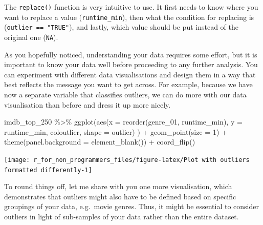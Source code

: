 \documentclass[
]{book}
\newenvironment{Shaded}{\begin{snugshade}}{\end{snugshade}}
\newcommand{\AttributeTok}[1]{\textcolor[rgb]{0.77,0.63,0.00}{#1}}
\newcommand{\DecValTok}[1]{\textcolor[rgb]{0.00,0.00,0.81}{#1}}
\newcommand{\FunctionTok}[1]{\textcolor[rgb]{0.00,0.00,0.00}{#1}}
\newcommand{\NormalTok}[1]{#1}
\newcommand{\SpecialCharTok}[1]{\textcolor[rgb]{0.00,0.00,0.00}{#1}}
\begin{document}
The \texttt{replace()} function is very intuitive to use. It first needs to know where you want to replace a value (\texttt{runtime\_min}), then what the condition for replacing is (\texttt{outlier\ ==\ "TRUE"}), and lastly, which value should be put instead of the original one (\texttt{NA}).

As you hopefully noticed, understanding your data requires some effort, but it is important to know your data well before proceeding to any further analysis. You can experiment with different data visualisations and design them in a way that best reflects the message you want to get across. For example, because we have now a separate variable that classifies outliers, we can do more with our data visualisation than before and dress it up more nicely.

\begin{Shaded}
\begin{Highlighting}[]
\NormalTok{imdb\_top\_250 }\SpecialCharTok{\%\textgreater{}\%}
  \FunctionTok{ggplot}\NormalTok{(}\FunctionTok{aes}\NormalTok{(}\AttributeTok{x =} \FunctionTok{reorder}\NormalTok{(genre\_01, runtime\_min),}
             \AttributeTok{y =}\NormalTok{ runtime\_min,}
\NormalTok{             coloutlier,}
             \AttributeTok{shape =}\NormalTok{ outlier)}
\NormalTok{         ) }\SpecialCharTok{+}
  \FunctionTok{geom\_point}\NormalTok{(}\AttributeTok{size =} \DecValTok{1}\NormalTok{) }\SpecialCharTok{+}
  \FunctionTok{theme}\NormalTok{(}\AttributeTok{panel.background =} \FunctionTok{element\_blank}\NormalTok{()) }\SpecialCharTok{+}
  \FunctionTok{coord\_flip}\NormalTok{()}
\end{Highlighting}
\end{Shaded}

\begin{center}\texttt{[image: r\_for\_non\_programmers\_files/figure-latex/Plot with outliers formatted differently-1]} \end{center}

To round things off, let me share with you one more visualisation, which demonstrates that outliers might also have to be defined based on specific groupings of your data, e.g.~movie genres. Thus, it might be essential to consider outliers in light of sub-samples of your data rather than the entire dataset.
\end{document}

